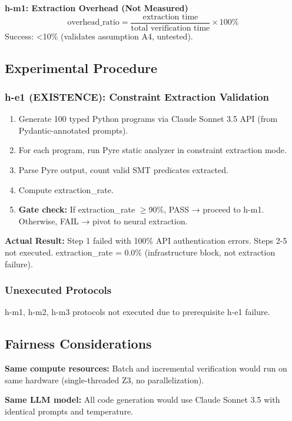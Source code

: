 \textbf{h-m1: Extraction Overhead (Not Measured)}
\[
\text{overhead\_ratio} = \frac{\text{extraction time}}{\text{total verification time}} \times 100\%
\]
Success: <10\% (validates assumption A4, untested).

\subsection{Experimental Procedure}

\subsubsection{h-e1 (EXISTENCE): Constraint Extraction Validation}

\begin{enumerate}
\item Generate 100 typed Python programs via Claude Sonnet 3.5 API (from Pydantic-annotated prompts).
\item For each program, run Pyre static analyzer in constraint extraction mode.
\item Parse Pyre output, count valid SMT predicates extracted.
\item Compute extraction\_rate.
\item \textbf{Gate check:} If extraction\_rate $\geq$90\%, PASS → proceed to h-m1. Otherwise, FAIL → pivot to neural extraction.
\end{enumerate}

\textbf{Actual Result:} Step 1 failed with 100\% API authentication errors. Steps 2-5 not executed. extraction\_rate = 0.0\% (infrastructure block, not extraction failure).

\subsubsection{Unexecuted Protocols}

h-m1, h-m2, h-m3 protocols not executed due to prerequisite h-e1 failure.

\subsection{Fairness Considerations}

\textbf{Same compute resources:} Batch and incremental verification would run on same hardware (single-threaded Z3, no parallelization).

\textbf{Same LLM model:} All code generation would use Claude Sonnet 3.5 with identical prompts and temperature.

